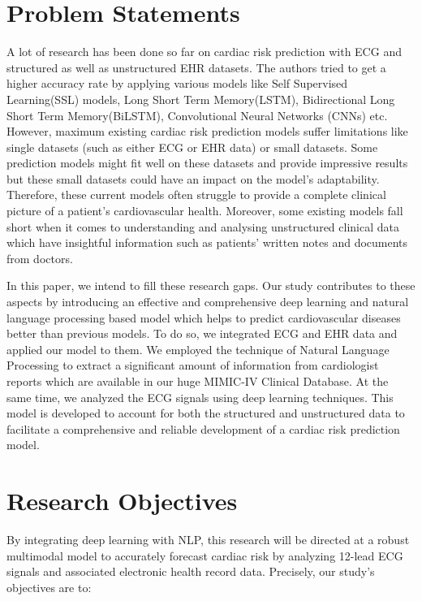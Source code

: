 
\section{Problem Statements }
A lot of research has been done so far on cardiac risk prediction with ECG and structured as well as unstructured EHR datasets. The authors tried to get a higher accuracy rate by applying various models like Self Supervised Learning(SSL) models, Long Short Term Memory(LSTM), Bidirectional Long Short Term Memory(BiLSTM), Convolutional Neural Networks (CNNs) etc. However, maximum existing cardiac risk prediction models suffer limitations like single datasets (such as either ECG or EHR data) or small datasets. Some prediction models might fit well on these datasets and provide impressive results but these small datasets could have an impact on the model's adaptability. Therefore, these current models often struggle to provide a complete clinical picture of a patient's cardiovascular health. Moreover, some existing models fall short when it comes to understanding and analysing unstructured clinical data which have insightful information such as patients’ written notes and documents from doctors.
\vspace{0.5cm}


In this paper, we intend to fill these research gaps. Our study contributes to these aspects by introducing an effective and comprehensive deep learning and natural language processing based model which helps to predict cardiovascular diseases better than previous models. To do so, we integrated ECG and EHR data and applied our model to them. We employed the technique of Natural Language Processing to extract a significant amount of information from cardiologist reports which are available in our huge MIMIC-IV Clinical Database. At the same time, we analyzed the ECG signals using deep learning techniques. This model is developed to account for both the structured and unstructured data to facilitate a comprehensive and reliable development of a cardiac risk prediction model.
\vspace{1.5cm}

\section{Research Objectives }
By integrating deep learning with NLP, this research will be directed at a robust multimodal model to accurately forecast cardiac risk by analyzing 12-lead ECG signals and associated electronic health record data. Precisely, our study’s objectives are to:

